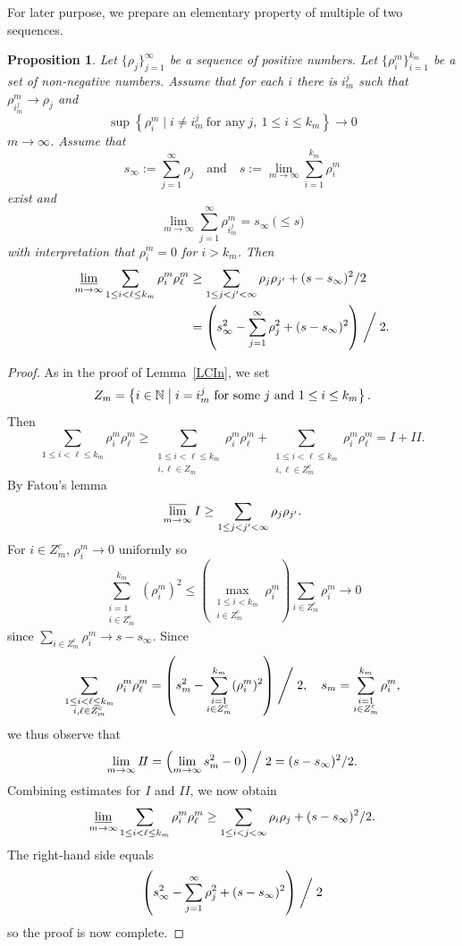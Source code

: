 \documentclass[12pt, reqno]{amsart}
\numberwithin{equation}{section}
\newtheorem{prop}[thm]{Proposition}
\begin{document}
For later purpose, we prepare an elementary property of multiple of two sequences.
\begin{prop} \label{PSec}
Let $\{\rho_j\}_{j=1}^\infty$ be a sequence of positive numbers.
 Let $\{\rho_i^m\}_{i=1}^{k_m}$ be a set of non-negative numbers.
 Assume that for each $i$ there is $i_m^j$ such that $\rho_{i_m^j}^m\to\rho_j$ and
\[
    \sup \left\{ \rho_i^m \mid
    i\neq i_m^j\ \text{for any}\ j,\ 1
    \le i\le k_m \right\} \to 0
\]
$m\to\infty$.
 Assume that
\[
    s_\infty := \sum_{j=1}^\infty \rho_j
    \quad\text{and}\quad s:= \lim_{m\to\infty} \sum_{i=1}^{k_m}\rho_i^m
\]
exist and
\[
    \lim_{m\to\infty} \sum_{j=1}^\infty \rho_{i_m^j}^m = s_\infty\ \text{(}\le s\text{)}
\]
with interpretation that $\rho_i^m=0$ for $i>k_m$.
 Then
\begin{align*}
    \varliminf_{m\to\infty} \sum_{1\le i<\ell\le k_m} \rho_i^m \rho_\ell^m
    &\ge \sum_{1\le j<j'<\infty} \rho_j \rho_{j'} + (s-s_\infty)^2/2 \\
    &= \left(s_\infty^2 - \sum_{j=1}^\infty \rho_j^2 + (s-s_\infty)^2 \right)\biggm/ 2.
\end{align*}
\end{prop}
%
\begin{proof}
As in the proof of Lemma~\ref{LCIn}, we set
\[
    Z_m = \left\{ i \in \mathbb{N} \bigm|
    i=i_m^j\ \text{for some}\ j\ \text{and}\ 1\le i\le k_m \right\}.
\]
Then
\[
    \sum_{1\le i<\ell\le k_m} \rho_i^m \rho_\ell^m
    \ge \sum_{\substack{1\le i<\ell\le k_m\\ i,\ell\in Z_m}} \rho_i^m \rho_\ell^m
    + \sum_{\substack{1\le i<\ell\le k_m\\ i,\ell\in Z_m^c}} \rho_i^m \rho_\ell^m
    = I + I\!I.
\]
By Fatou's lemma
\[
    \varlimsup_{m\to\infty} I 
    \ge \sum_{ 1\le j<j'<\infty} \rho_j \rho_{j'}.
\]
For $i\in Z_m^c$, $\rho_i^m\to0$ uniformly so
\[
    \sum_{\substack{i=1 \\ i\in Z_m^c}}^{k_m} (\rho_i^m)^2
    \le \left( \max_{\substack{1\le i<k_m\\ i\in Z_m^c}} \rho_i^m \right) \sum_{i\in Z_m^c} \rho_i^m \to 0
\]
since $\sum_{i\in Z_m^c} \rho_i^m \to s-s_\infty$.
 Since
\[
    \sum_{\substack{1\le i<\ell\le k_m \\ i,\ell\in Z_m^c}} \rho_i^m \rho_\ell^m
    = \left( s_m^2 - \sum_{\substack{i=1 \\ i\in Z_m^c}}^{k_m} (\rho_i^m)^2\right)\Biggm/2,\quad
    s_m = \sum_{\substack{i=1 \\ i\in Z_m^c}}^{k_m} \rho_i^m,
\]
we thus observe that
\[
    \lim_{m\to\infty} I\!I = \left(\lim_{m\to\infty} s_m^2 - 0\right) \Bigm/2
    = (s-s_\infty)^2/2.
\]
Combining estimates for $I$ and $I\!I$, we now obtain
\[
    \varliminf_{m\to\infty} \sum_{1\le i<\ell\le k_m} \rho_i^m \rho_\ell^m
    \ge \sum_{1\le i<j<\infty} \rho_i \rho_j + (s-s_\infty)^2/2.
\]
The right-hand side equals
\[
    \left(s_\infty^2 - \sum_{j=1}^\infty \rho_j^2
    + (s-s_\infty)^2 \right) \biggm/2
\]
so the proof is now complete.
\end{proof}
\end{document}
